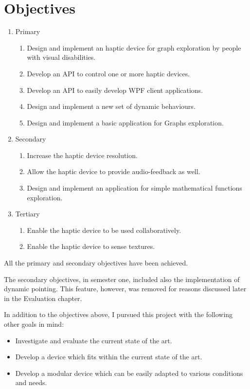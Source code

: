 \chapter{Objectives}


\begin{enumerate}
	\item Primary
    \begin{enumerate}
    	\item Design and implement an haptic device for graph exploration by people with visual disabilities.
        \item Develop an API to control one or more haptic devices.
        \item Develop an API to easily develop WPF client applications.
        \item Design and implement a new set of dynamic behaviours.
        \item Design and implement a basic application for Graphs exploration.
    \end{enumerate}
    \item Secondary
    \begin{enumerate}
        \item Increase the haptic device resolution.
        \item Allow the haptic device to provide audio-feedback as well.
        \item Design and implement an application for simple mathematical functions exploration.
    \end{enumerate}
    \item Tertiary
    \begin{enumerate}
    	\item Enable the haptic device to be used collaboratively.
        \item Enable the haptic device to sense textures.
    \end{enumerate}
\end{enumerate}

All the primary and secondary objectives have been achieved.\par
The secondary objectives, in semester one, included also the implementation of dynamic pointing. This feature, however, was removed for reasons discussed later in the Evaluation chapter.

In addition to the objectives above, I pursued this project with the following other goals in mind:
\begin{itemize}
	\item Investigate and evaluate the current state of the art.
    \item Develop a device which fits within the current state of the art.
    \item Develop a modular device which can be easily adapted to various conditions and needs.
\end{itemize}